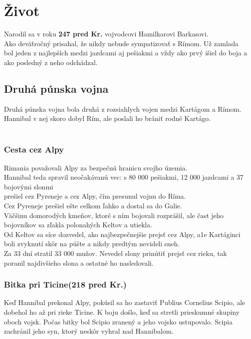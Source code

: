 \documentclass{article}
\begin{document}
\section{Život}
\label{sec:life}
Narodil sa v roku \textbf{247 pred Kr.} vojvodcovi Hamilkarovi Barkasovi.\\
Ako deväťročný prisahal, že nikdy nebude sympatizovať s Rímom.
Už zamlada bol jeden z najlepších medzi jazdcami aj pešiakmi a vždy ako  prvý išiel do boja a ako posledný z neho odchádzal.
\subsection{Druhá púnska vojna}
\label{subsec:secondpunianwar}
Druhá púnska vojna bola druhá z rozsiahlych vojen medzi Kartágom a Rímom.
Hannibal v nej skoro dobyl Rím, ale poslali ho brániť rodné Kartágo.\\\\
\subsubsection{Cesta cez Alpy}
\label{subsubsec:alpine}
Rimania považovali Alpy za bezpečnú hranicu svojho územia. \\Hannibal teda spravil neočakávanú vec: s 80 000 pešiakmi, 12 000 jazdcami a 37 bojovými slonmi \\prešiel cez Pyreneje a cez Alpy, čím presunul vojnu do Ríma.
\\Cez Pyreneje prešiel ešte celkom ľahko a dostal sa do Galie. \\
Väčšinu domorodých kmeňov, ktoré s ním bojovali rozprášil, ale čast jeho bojovníkov sa zľakla polonahých Keltov a utiekla.\\
Od Keltov sa síce dozvedel, ako najbezpečnejšie prejsť cez Alpy, a1e Kartáginci boli zvyknutí skôr na púšte a nikdy predtým nevideli sneh.\\
Za 33 dní stratil 33 000 mužov. Nevedel slony prinútiť prejsť cez rieku, tak poranil najdivšieho slona a ostatné ho nasledovali.\\
\subsubsection{Bitka pri Ticine(218 pred Kr.)}
Keď Hannibal prekonal Alpy, pokúsil sa ho zastaviť Publius Cornelius Scipio, ale dobehol ho až pri rieke Ticine.
K boju došlo, keď sa stretli prieskumné skupiny oboch vojsk. 
Počas bitky bol Scipio zranený a jeho vojsko ustupovalo.
Scipia zachránil jeho syn, ktorý neskôr vyhral nad Hannibalom.
\end{document}
